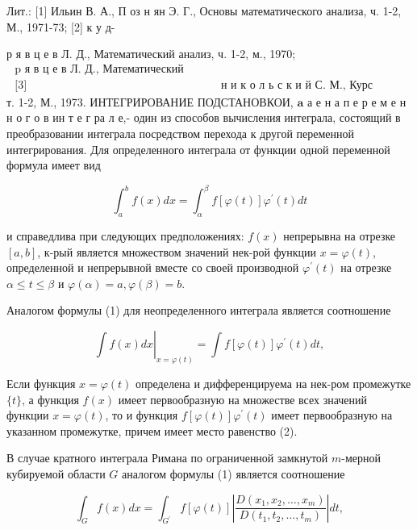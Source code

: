 \documentclass[10pt]{article}
\begin{document}
Лит.: [1] Ильин В. А., П оз н ян Э. Г., Основы математического анализа, ч. 1-2, М., 1971-73; [2] к у д-

р я в ц е в Л. Д., Математический анализ, ч. 1-2, м., 1970; $\begin{array}{ll}\text { p я в ц е в Л. Д., Математический анализ, ч. 1-2, М., 1970; } \\ \text { [3] } & \text { н и к о л ь с к и й С. М., Курс математического анализа, }\end{array}$ т. 1-2, М., 1973. ИНТЕГРИРОВАНИЕ ПОДСТАНОВКОИ, $\mathbf{a}$ а е н а п е р е м е н н о г о в ин т е г ра л е,- один из способов вычисления интеграла, состоящий в преобразовании интеграла посредством перехода к другой переменной интегрирования. Для определенного интеграла от функции одной переменной формула имеет вид



\[

\int_{a}^{b} f(x) d x=\int_{\alpha}^{\beta} f[\varphi(t)] \varphi^{\prime}(t) d t

\]



и справедлива при следующих предположениях: $f(x)$ непрерывна на отрезке $[a, b]$, к-рый является множеством значений нек-рой функции $x=\varphi(t)$, определенной и непрерывной вместе со своей производной $\varphi^{\prime}(t)$ на отрезке $\alpha \leqslant t \leqslant \beta$ и $\varphi(\alpha)=a, \varphi(\beta)=b$.



Аналогом формулы (1) для неопределенного интеграла является соотношение



\[

\left.\int f(x) d x\right|_{x=\varphi(t)}=\int f[\varphi(t)] \varphi^{\prime}(t) d t,

\]



Если функция $x=\varphi(t)$ определена и дифференцируема на нек-ром промежутке $\{t\}$, а функция $f(x)$ имеет первообразную на множестве всех значений функции $x=\varphi(t)$, то и функция $f[\varphi(t)] \varphi^{\prime}(t)$ имеет первообразную на указанном промежутке, причем имеет место равенство (2).



В случае кратного интеграла Римана по ограниченной замкнутой $m$-мерной кубируемой области $G$ аналогом формулы (1) является соотношение



\[

\int_{G} f(x) d x=\int_{G^{\prime}} f[\varphi(t)]\left|\frac{D\left(x_{1}, x_{2}, \ldots, x_{m}\right)}{D\left(t_{1}, t_{2}, \ldots, t_{m}\right)}\right| d t,

\]
\end{document}
